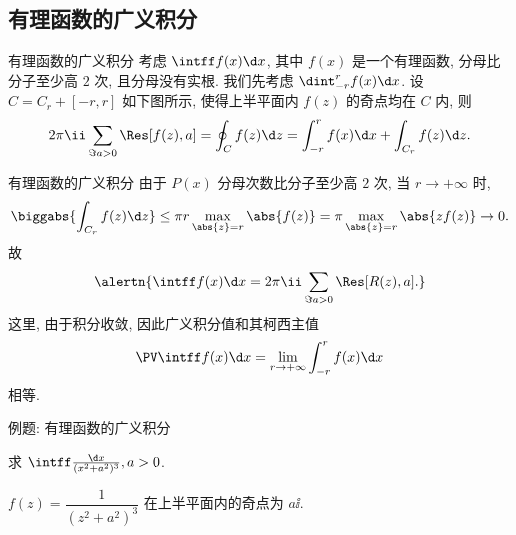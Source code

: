 \subsection{有理函数的广义积分}

\begin{frame}{有理函数的广义积分}
	\onslide<+->
	考虑 $\intff f(x)\d x$, 其中 $f(x)$ 是一个有理函数, 分母比分子至少高 $2$ 次, 且分母没有实根.
	\onslide<+->
	我们先考虑 $\dint_{-r}^rf(x)\d x$.
	\onslide<+->
	设 $C=C_r+[-r,r]$ 如下图所示, 使得上半平面内 $f(z)$ 的奇点均在 $C$ 内,
	\onslide<+->
	则
	\[
		2\pi\ii\sum_{\Im a>0}\Res[f(z),a]=\oint_Cf(z)\d z=\int_{-r}^rf(x)\d x+\int_{C_r}f(z)\d z.
	\]
	\onslide<3->
	\begin{center}
	\end{center}
\end{frame}


\begin{frame}{有理函数的广义积分}
	\onslide<+->
	由于 $P(x)$ 分母次数比分子至少高 $2$ 次,
	\onslide<+->
	当 $r\to+\infty$ 时,
	\[
		\biggabs{\int_{C_r}f(z)\d z}\le \pi r\max_{\abs{z}=r}\abs{f(z)}
		=\pi \max_{\abs{z}=r}\abs{zf(z)}\to 0.
	\]
	\onslide<+->
	故
	\[
		\alertn{\intff f(x)\d x=2\pi\ii\sum_{\Im a>0}\Res[R(z),a].}
	\]
	\onslide<+->
	这里, 由于积分收敛, 因此广义积分值和其柯西主值
	\[
		\PV\intff f(x)\d x=\lim_{r\to+\infty}\int_{-r}^rf(x)\d x
	\]
	相等.
\end{frame}


\begin{frame}{例题: 有理函数的广义积分}
	\onslide<+->
	\begin{example}[nearnext]
		求 $\intff \frac{\d x}{(x^2+a^2)^3},a>0$.
	\end{example}
	\onslide<+->
	\begin{solution}[nearprev]
		$f(z)=\dfrac1{(z^2+a^2)^3}$ 在上半平面内的奇点为 $a\ii$.
		\bigdel
	\end{solution}
\end{frame}


